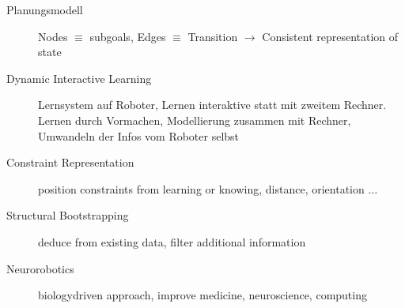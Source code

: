 \begin{description}
	\item[Planungsmodell] Nodes $\equiv$ subgoals, Edges $\equiv$ Transition $\rightarrow$ Consistent representation of state
	\item[Dynamic Interactive Learning] Lernsystem auf Roboter, Lernen interaktive statt mit zweitem Rechner. Lernen durch Vormachen, Modellierung zusammen mit Rechner, Umwandeln der Infos vom Roboter selbst
	\item[Constraint Representation] position constraints from learning or knowing, distance, orientation $\dots$
	\item[Structural Bootstrapping] deduce from existing data, filter additional information
	\item[Neurorobotics] biologydriven approach, improve medicine, neuroscience, computing
\end{description}